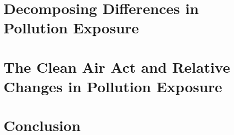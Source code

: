 \documentclass[dvipdfmx,12pt]{beamer}
\begin{document}
\section{Decomposing Differences in Pollution Exposure}
\frame{\sectionpage}
\begin{frame}{}
  
\end{frame}

\section{The Clean Air Act and Relative Changes in Pollution Exposure}
\frame{\sectionpage}
\begin{frame}{}
  
\end{frame}

\section{Conclusion}
\frame{\sectionpage}
\begin{frame}{}
  
\end{frame}
\end{document}
